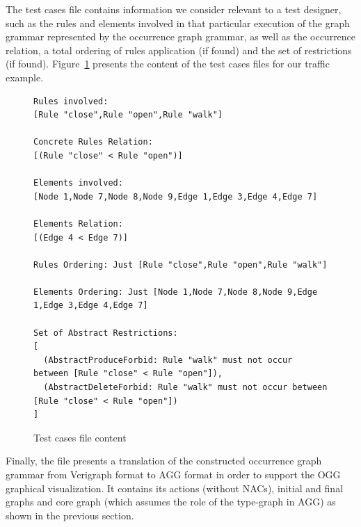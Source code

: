 The test cases file contains information we consider relevant to a test designer, such as the rules and elements involved in that particular execution of the graph grammar represented by the occurrence graph grammar, as well as the occurrence relation, a total ordering of rules application (if found) and the set of restrictions (if found). Figure~\ref{fig:tests:cases} presents the content of the test cases files for our traffic example.


\begin{figure}[!ht]
\caption{Test cases file content}
\begin{verbatim}
Rules involved:
[Rule "close",Rule "open",Rule "walk"]

Concrete Rules Relation:
[(Rule "close" < Rule "open")]

Elements involved:
[Node 1,Node 7,Node 8,Node 9,Edge 1,Edge 3,Edge 4,Edge 7]

Elements Relation:
[(Edge 4 < Edge 7)]

Rules Ordering: Just [Rule "close",Rule "open",Rule "walk"]

Elements Ordering: Just [Node 1,Node 7,Node 8,Node 9,Edge 1,Edge 3,Edge 4,Edge 7]

Set of Abstract Restrictions:
[
  (AbstractProduceForbid: Rule "walk" must not occur between [Rule "close" < Rule "open"]),
  (AbstractDeleteForbid: Rule "walk" must not occur between [Rule "close" < Rule "open"])
]
\end{verbatim}
  \label{fig:tests:cases}
\end{figure}

Finally, the  file presents a translation of the constructed occurrence graph grammar from Verigraph format to AGG format in order to support the OGG graphical visualization. It contains its actions (without NACs), initial and final graphs and core graph (which assumes the role of the type-graph in AGG) as shown in the previous section.


